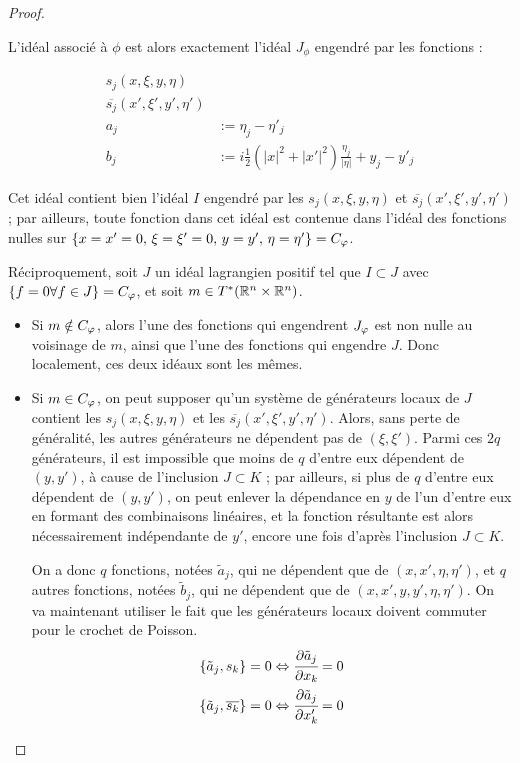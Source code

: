 \begin{proof}
\begin{enumerate}
  L'idéal associé à $\phi$ est alors exactement l'idéal $J_{\phi}$ engendré par les fonctions :
  
  \begin{align*}
    s_j(x,\xi,y,\eta)&\\
    \overline{s_j}(x',\xi',y',\eta')&\\
    a_j &:= \eta_j - \eta'_j\\
    b_j &:= i \frac 12 (|x|^2 + |x'|^2)\frac{\eta_j}{|\eta|} + y_j-y'_j
  \end{align*}
  
  Cet idéal contient bien l'idéal $I$ engendré par les $s_j(x,\xi,y,\eta)$ et $\overline{s_j}(x',\xi',y',\eta')$ ; par ailleurs, toute fonction dans cet idéal est contenue dans l'idéal des fonctions nulles sur  $\{x=x'=0,\,\xi=\xi'=0,\,y=y',\,\eta=\eta'\}=C_{\varphi}$.
  
Réciproquement, soit $J$ un idéal lagrangien positif tel que $I \subset J$ avec $\{f=0 \forall f \in J\}=C_{\varphi}$, et soit $m \in T^*(\mathbb{R}^n \times \mathbb{R}^n)$.

\begin{itemize}
  \item Si $m \notin C_{\varphi}$, alors l'une des fonctions qui engendrent $J_{\varphi}$ est non nulle au voisinage de $m$, ainsi que l'une des fonctions qui engendre $J$. Donc localement, ces deux idéaux sont les mêmes.
  
  \item Si $m\in C_{\varphi}$, on peut supposer qu'un système de générateurs locaux de $J$ contient les $s_j(x,\xi,y,\eta)$ et les $\overline{s_j}(x',\xi',y',\eta')$. Alors, sans perte de généralité, les autres générateurs ne dépendent pas de $(\xi,\xi')$. Parmi ces $2q$ générateurs, il est impossible que moins de $q$ d'entre eux dépendent de $(y,y')$, à cause de l'inclusion $J \subset K$ ; par ailleurs, si plus de $q$ d'entre eux dépendent de $(y,y')$, on peut enlever la dépendance en $y$ de l'un d'entre eux en formant des combinaisons linéaires, et la fonction résultante est alors nécessairement indépendante de $y'$, encore une fois d'après l'inclusion $J \subset K$.

On a donc $q$ fonctions, notées $\tilde{a}_j$, qui ne dépendent que de $(x,x',\eta,\eta')$, et $q$ autres fonctions, notées $\tilde{b}_j$, qui ne dépendent que de $(x,x',y,y',\eta,\eta')$. On va maintenant utiliser le fait que les générateurs locaux doivent commuter pour le crochet de Poisson.
\begin{align*}
  \{\tilde{a}_j,s_k\}=0 \Leftrightarrow \cfrac{\partial \tilde{a}_j}{\partial x_k} =0\\
   \{\tilde{a}_j,\overline{s_k}\}=0 \Leftrightarrow \cfrac{\partial \tilde{a}_j}{\partial x'_k} =0
\end{align*}


\end{itemize}
\end{enumerate}
\end{proof}
